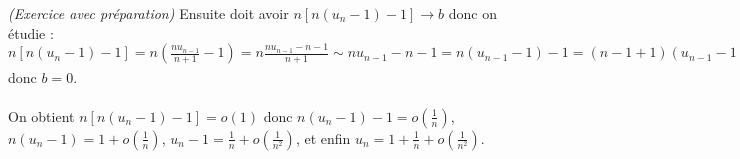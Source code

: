 \documentclass[11pt]{article}%
\begin{document}
\begin{exercice}{\it (Exercice avec préparation)}
 Ensuite doit avoir $n[n(u_{n} -1) -1 ] \rightarrow b$ donc on étudie :
\\
 $n[ n (u_{n} - 1) - 1] = n \left( \frac{n u_{n-1} }{n + 1} -1 \right)
= n \frac{ n u_{n-1} - n -1}{n + 1} \sim n u_{n-1} - n - 1 = n (
u_{n-1} - 1) -1 = (n-1 + 1) ( u_{n-1} -1 ) - 1 = (n-1) (u_{n-1} - 1) +
u_{n-1} - 2 \xrightarrow[ n \rightarrow + \infty]{} 1 + 1 - 2 = 0$ donc
$b = 0$. \\
\\
 On obtient $n[ n (u_{n} - 1) - 1] = o(1)$ donc $n (u_{n} -1) -1 = o
\left( \frac{1}{n} \right)$, $n (u_{n} -1) = 1 + o \left( \frac{1}{n}
\right)$, $u_{n} - 1 = \frac{1}{n} + o \left( \frac{1}{n^{2}} \right)$,
et enfin $u_{n} = 1 + \frac{1}{n} + o \left( \frac{1}{n^{2}} \right)$.

 \end{exercice}

 \newpage
\end{document}
